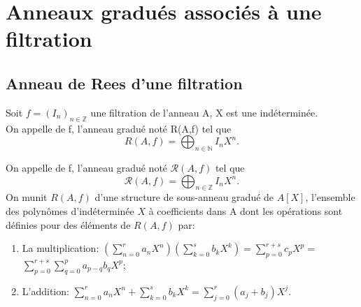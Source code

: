 \section{Anneaux gradués associés à une filtration}
\subsection{Anneau de Rees d'une filtration}
\begin{madefinition}
	Soit $f=(I_n)_{n \in \mathbb{Z}}$ une filtration de l'anneau A, X est une indéterminée.\\
	On appelle  de f, l'anneau gradué noté R(A,f) tel que 
	\[ R(A,f)  =\displaystyle \bigoplus_{n \in \mathbb{N}}{I_n X^n}.  \]
	
	On appelle  de f, l'anneau gradué noté $\mathcal{R}(A,f)$ tel que 
	\[ \mathcal{R}(A,f) = \displaystyle \bigoplus_{n \in \mathbb{Z}}{I_n X^n}.  \]
	On munit $R(A,f)$ d'une structure de sous-anneau gradué de $A[X]$, l'ensemble des polynômes d'indéterminée $X$ à coefficients dans A dont les opérations sont définies pour des éléments de $R(A,f)$ par:
	
	\begin{enumerate}
		\item La multiplication:	$(\sum\limits_{n=0}^{r}a_{n}X^{n})(\sum\limits_{k=0}^{s}b_{k}X^{k})=\sum\limits_{p=0}^{r+s}c_{p}X^{p}=$ $\sum\limits_{p=0}^{r+s}\sum\limits_{q=0}^{p}a_{p-q}b_{q}X^{p}$;
		\item L'addition:   $\sum\limits_{n=0}^{r}a_{n}X^{n}+\sum\limits_{k=0}^{s}b_{k}X^{k}=\sum\limits_{j=0}^{r}(a_{j}+b_{j})X^{j}$.
	\end{enumerate}
\end{madefinition}
